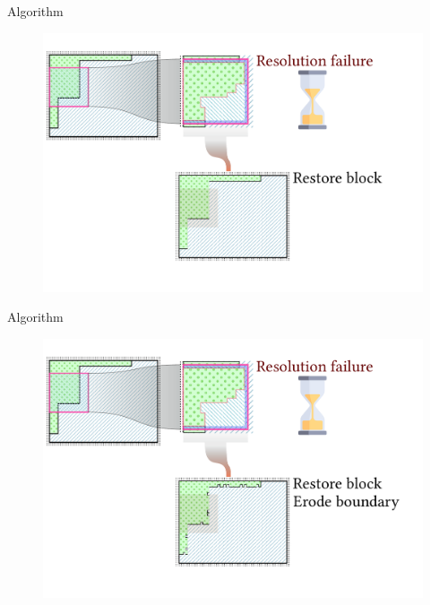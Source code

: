 \documentclass{beamer}
\begin{document}
  \begin{frame}[fragile]{Algorithm}
    \begin{figure}
      \includegraphics[width=\textwidth]{figs/poms_alg5_1.pdf}
    \end{figure}
  \end{frame}

  \begin{frame}[fragile]{Algorithm}
    \begin{figure}
      \includegraphics[width=\textwidth]{figs/poms_alg5_2.pdf}
    \end{figure}
  \end{frame}
\end{document}
